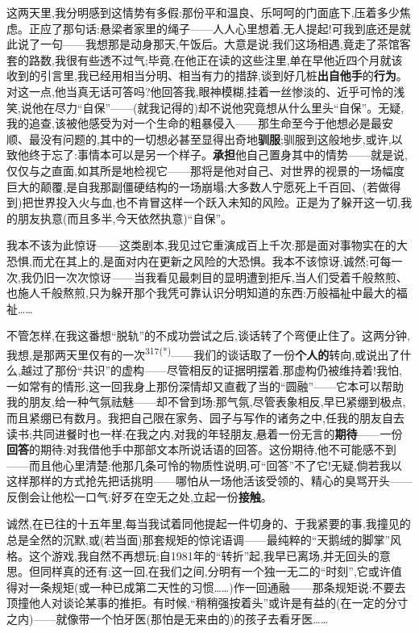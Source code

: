 \dmark{}这两天里,我分明感到这情势有多假:那份平和温良、乐呵呵的门面底下,压着多少焦虑。正应了那句话:悬梁者家里的绳子——人人心里想着,无人提起!可我到底还是就此说了一句——我想那是动身那天,午饭后。大意是说:我们这场相遇,竟走了茶馆客套的路数,我很有些透不过气;毕竟,在他正在读的这些注里,单在早他近四个月就该收到的引言里,我已经用相当分明、相当有力的措辞,谈到好几桩\textbf{出自他手}的\textbf{行为}。对这一点,他当真无话可答吗?他回答我,眼神模糊,挂着一丝惨淡的、近乎可怜的浅笑,说他在尽力“自保”——(就我记得的)却不说他究竟想从什么里头“自保”。无疑,我的追查,该被他感受为对一个生命的粗暴侵入——那生命至今于他想必是最安顺、最没有问题的,其中的一切想必甚至显得出奇地\textbf{驯服};驯服到这般地步,或许,以致他终于忘了:事情本可以是另一个样子。\textbf{承担}他自己置身其中的情势——就是说,仅仅与之直面,如其所是地检视它——那将是他对自己、对世界的视景的一场幅度巨大的颠覆,是自我那副僵硬结构的一场崩塌;大多数人宁愿死上千百回、(若做得到)把世界投入火与血,也不肯冒这样一个跃入未知的风险。正是为了躲开这一切,我的朋友执意(而且多半,今天依然执意)“自保”。

我本不该为此惊讶——这类剧本,我见过它重演成百上千次:那是面对事物实在的大恐惧,而尤在其上的,是面对内在更新之风险的大恐惧。我本不该惊讶,诚然;可每一次,我仍旧一次次惊讶——当我看见最刺目的显明遭到拒斥,当人们受着千般熬煎、也施人千般熬煎,只为躲开那个我凭可靠认识分明知道的东西:万般福祉中最大的福祉……

不管怎样,在我这番想“脱轨”的不成功尝试之后,谈话转了个弯便止住了。这两分钟,我想,是那两天里仅有的一次\textsuperscript{317(*)}——我们的谈话取了一份\textbf{个人的}转向\dmark{},或说出了什么,越过了那份“共识”的虚构——尽管相反的证据明摆着,那虚构仍被维持着!我怕,一如常有的情形,这一回我身上那份深情却又直截了当的“圆融”——它本可以帮助我的朋友,给一种气氛祛魅——却不曾到场:那气氛,尽管表象相反,早已紧绷到极点,而且紧绷已有数月。我把自己限在家务、园子与写作的诸务之中,任我的朋友自去读书;共同进餐时也一样:在我之内,对我的年轻朋友,悬着一份无言的\textbf{期待}——一份\textbf{回答}的期待:对我借他手中那部文本所说话语的回答。这份期待,他不可能感不到——而且他心里清楚:他那几条可怜的物质性说明,可“回答”不了它!无疑,倘若我以这样那样的方式抢先把话挑明——哪怕从一场他活该受领的、精心的臭骂开头——反倒会让他松一口气:好歹在空无之处,立起一份\textbf{接触}。

诚然,在已往的十五年里,每当我试着同他提起一件切身的、于我紧要的事,我撞见的总是全然的沉默,或(若当面)那套规矩的惊诧语调——最纯粹的“天鹅绒的脚掌”风格。这个游戏,我自然不再想玩;自1981年的“转折”起,我早已离场,并无回头的意思。但同样真的还有:这一回,在我们之间,分明有一个独一无二的“时刻”,它或许值得对一条规矩(或一种已成第二天性的习惯……)作一回通融——那条规矩说:不要去顶撞他人对谈论某事的推拒。有时候,“稍稍强按着头”或许是有益的(在一定的分寸之内)——就像带一个怕牙医(那怕是无来由的)的孩子去看牙医……

